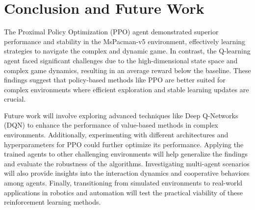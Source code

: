 \documentclass[final,numbers]{article}
\begin{document}
\section{Conclusion and Future Work}
The Proximal Policy Optimization (PPO) agent demonstrated superior performance and stability in the MsPacman-v5 environment, effectively learning strategies to navigate the complex and dynamic game. In contrast, the Q-learning agent faced significant challenges due to the high-dimensional state space and complex game dynamics, resulting in an average reward below the baseline. These findings suggest that policy-based methods like PPO are better suited for complex environments where efficient exploration and stable learning updates are crucial.

Future work will involve exploring advanced techniques like Deep Q-Networks (DQN) to enhance the performance of value-based methods in complex environments. Additionally, experimenting with different architectures and hyperparameters for PPO could further optimize its performance. Applying the trained agents to other challenging environments will help generalize the findings and evaluate the robustness of the algorithms. Investigating multi-agent scenarios will also provide insights into the interaction dynamics and cooperative behaviors among agents. Finally, transitioning from simulated environments to real-world applications in robotics and automation will test the practical viability of these reinforcement learning methods.



\end{document}
